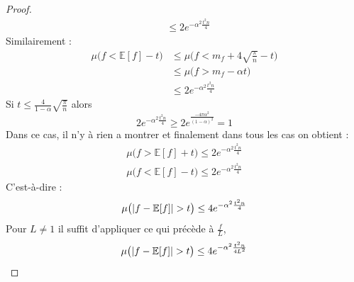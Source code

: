 \documentclass[12pt]{article}
\theoremstyle{definition}
\begin{document}
\begin{proof}
\begin{align*}
	&\leq 2 e^{-\alpha^2\frac{t^2n}{4}}
	\end{align*}
	Similairement :
	\begin{align*}
	\mu\big(f<\mathbb{E}[f]-t\big)&\leq \mu\big(f<m_f+4\sqrt{\frac{\pi}{n}}-t\big)\\
	&\leq \mu\big(f>m_f-\alpha t\big)\\
	&\leq 2 e^{-\alpha^2\frac{t^2n}{4}}
	\end{align*}
	Si $t\leq\frac{4}{1-\alpha}\sqrt{\frac{\pi}{n}}$ alors  
	\begin{equation*}
	2e^{-\alpha^2\frac{t^2n}{4}}\geq 2 e^{\frac{-4\pi\alpha^2}{(1-\alpha)^2}}=1
	\end{equation*}
	Dans ce cas, il n'y à rien a montrer et finalement dans tous les cas on obtient :
	\begin{align*}
	\mu\big(f>\mathbb{E}[f]+t\big) \leq 2 e^{-\alpha^2\frac{t^2n}{4}}\\
	\mu\big(f<\mathbb{E}[f]-t\big)\leq 2 e^{-\alpha^2\frac{t^2n}{4}}
	\end{align*}
	C'est-à-dire : 
	\begin{equation*}
	\mu\big(|f-\mathbb{E}[f]|>t\big) \leq 4 e^{-\alpha^2\frac{t^2n}{4}}\\
	\end{equation*}
	Pour $L\neq 1$ il suffit d'appliquer ce qui précède à $\frac{f}{L}$,
	\begin{equation*}
	\mu\big(|f-\mathbb{E}[f]|>t\big) \leq 4 e^{-\alpha^2\frac{t^2n}{4L^2}}\\
	\end{equation*}
\end{proof}
\end{document}
